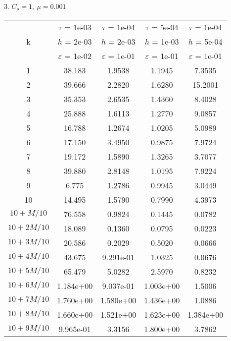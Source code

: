 3. $C_{\rho} = 1, \ \mu = 0.001$
\begin{center}
	\begin{tabular}{ |c|c|c|c|c| } 
		\hline
		& $\tau$ = 1e-03 & $\tau$ = 1e-04 & $\tau$ = 5e-04 & $\tau$ = 1e-04 \\ 
		k & $h$ = 2e-03 & $h$ = 2e-03 & $h$ = 1e-03 & $h$ = 5e-04 \\ 
		& $\varepsilon$ = 1e-02 & $\varepsilon$ = 1e-01 & $\varepsilon$ = 1e-01 & $\varepsilon$ = 1e-01 \\ 
		\hline
		1 & 38.183 & 1.9538 & 1.1945 & 7.3535 \\
		\hline
		2 & 39.666 & 2.2820 & 1.6280 & 15.2001 \\
		\hline
		3 & 35.353 & 2.6535 & 1.4360 & 8.4028 \\
		\hline
		4 & 25.888 & 1.6113 & 1.2770 & 9.0857 \\
		\hline
		5 & 16.788 & 1.2674 & 1.0205 & 5.0989 \\
		\hline
		6 & 17.150 & 3.4950 & 0.9875 & 7.9724 \\
		\hline
		7 & 19.172 & 1.5890 & 1.3265 & 3.7077 \\
		\hline
		8 & 39.880 & 2.8148 & 1.0195 & 7.9224 \\
		\hline
		9 & 6.775 & 1.2786 & 0.9945 & 3.0449 \\
		\hline
		10 & 14.495 & 1.5790 & 0.7990 & 4.3973 \\
		\hline
		$10 + M/10$ & 76.558 & 0.9824 & 0.1445 & 0.0782 \\
		\hline
		$10 + 2M/10$ & 18.089 & 0.1360 & 0.0795 & 0.0223 \\
		\hline
		$10 + 3M/10$ & 20.586 & 0.2029 & 0.5020 & 0.0666 \\
		\hline
		$10 + 4M/10$ & 43.675 & 9.291e-01 & 1.0325 & 0.0676 \\
		\hline
		$10 + 5M/10$ & 65.479 & 5.0282 & 2.5970 & 0.8232 \\
		\hline
		$10 + 6M/10$ & 1.184e+00 & 9.037e-01 & 1.003e+00 & 1.5006 \\
		\hline
		$10 + 7M/10$ & 1.760e+00 & 1.580e+00 & 1.436e+00 & 1.0886 \\
		\hline
		$10 + 8M/10$ & 1.660e+00 & 1.521e+00 & 1.623e+00 & 1.384e+00 \\
		\hline
		$10 + 9M/10$ & 9.965e-01 & 3.3156 & 1.800e+00 & 3.7862 \\
		\hline
	\end{tabular}
\end{center}

